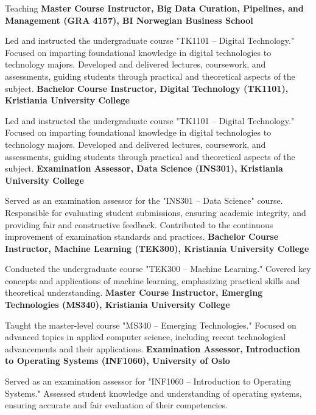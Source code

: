 \begin{rubric}{Teaching}
\entry*[2023]%
\textbf{Master Course Instructor, Big Data Curation, Pipelines, and Management (GRA 4157), BI Norwegian Business School} \par
Led and instructed the undergraduate course "TK1101 – Digital Technology."
Focused on imparting foundational knowledge in digital technologies to technology majors.
Developed and delivered lectures, coursework, and assessments, guiding students through practical and theoretical aspects of the subject.
%
\entry*[2020]%
\textbf{Bachelor Course Instructor, Digital Technology (TK1101), Kristiania University College} \par
Led and instructed the undergraduate course "TK1101 – Digital Technology."
Focused on imparting foundational knowledge in digital technologies to technology majors.
Developed and delivered lectures, coursework, and assessments, guiding students through practical and theoretical aspects of the subject.
%
\entry*[2019]%
\textbf{Examination Assessor, Data Science (INS301), Kristiania University College} \par
Served as an examination assessor for the "INS301 – Data Science" course.
Responsible for evaluating student submissions, ensuring academic integrity, and providing fair and constructive feedback.
Contributed to the continuous improvement of examination standards and practices.
%
\entry*[2019]%
\textbf{Bachelor Course Instructor, Machine Learning (TEK300), Kristiania University College} \par
Conducted the undergraduate course "TEK300 – Machine Learning."
Covered key concepts and applications of machine learning, emphasizing practical skills and theoretical understanding.
%
\entry*[2019]%
\textbf{Master Course Instructor, Emerging Technologies (MS340), Kristiania University College} \par
Taught the master-level course "MS340 – Emerging Technologies."
Focused on advanced topics in applied computer science, including recent technological advancements and their applications.
%
\entry*[2019]%
\textbf{Examination Assessor, Introduction to Operating Systems (INF1060), University of Oslo} \par
Served as an examination assessor for "INF1060 – Introduction to Operating Systems."
Assessed student knowledge and understanding of operating systems, ensuring accurate and fair evaluation of their competencies.
\end{rubric}